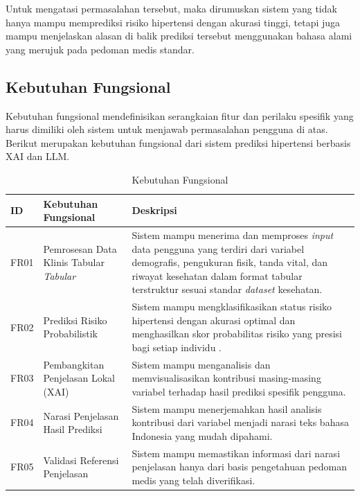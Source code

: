 Untuk mengatasi permasalahan tersebut, maka dirumuskan sistem yang tidak hanya mampu memprediksi risiko hipertensi dengan akurasi tinggi, tetapi juga mampu menjelaskan alasan di balik prediksi tersebut menggunakan bahasa alami yang merujuk pada pedoman medis standar.

\subsection{Kebutuhan Fungsional}
Kebutuhan fungsional mendefinisikan serangkaian fitur dan perilaku spesifik yang harus dimiliki oleh sistem untuk menjawab permasalahan pengguna di atas. Berikut merupakan kebutuhan fungsional dari sistem prediksi hipertensi berbasis XAI dan LLM.

\begin{table}[ht]
    \caption{Kebutuhan Fungsional}
    \label{tab:kebutuhan-fungsional}
    \centering
    \small
    \begin{tabular}{|p{1.5cm}|p{3.5cm}|p{8cm}|}
        \hline
        \textbf{ID} & \textbf{Kebutuhan Fungsional} & \textbf{Deskripsi} \\
        \hline
        FR01 & Pemrosesan Data Klinis Tabular \textit{Tabular} & Sistem mampu menerima dan memproses \textit{input} data pengguna yang terdiri dari variabel demografis, pengukuran fisik, tanda vital, dan riwayat kesehatan dalam format tabular terstruktur sesuai standar \textit{dataset} kesehatan. \\
        \hline
        FR02 & Prediksi Risiko Probabilistik & Sistem mampu mengklasifikasikan status risiko hipertensi dengan akurasi optimal dan menghasilkan skor probabilitas risiko yang presisi bagi setiap individu . \\
        \hline
        FR03 & Pembangkitan Penjelasan Lokal (XAI) & Sistem mampu menganalisis dan memvisualisasikan kontribusi masing-masing variabel terhadap hasil prediksi spesifik pengguna. \\
        \hline
        FR04 & Narasi Penjelasan Hasil Prediksi & Sistem mampu menerjemahkan hasil analisis kontribusi dari variabel menjadi narasi teks bahasa Indonesia yang mudah dipahami. \\
        \hline
        FR05 & Validasi Referensi Penjelasan & Sistem mampu memastikan informasi dari narasi penjelasan hanya dari basis pengetahuan pedoman medis yang telah diverifikasi. \\
        \hline
    \end{tabular}
\end{table}



